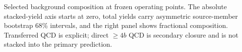 Selected background composition at frozen operating points. The absolute stacked-yield axis starts at zero, total yields carry asymmetric source-member bootstrap 68\% intervals, and the right panel shows fractional composition. Transferred QCD is explicit; direct $\geq4b$ QCD is secondary closure and is not stacked into the primary prediction.
